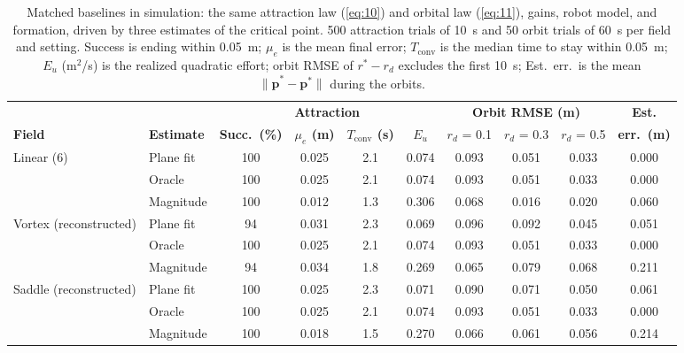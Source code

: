 \documentclass[10pt]{article}
\begin{document}
\begin{table}[h]
\centering
\footnotesize
\caption{Matched baselines in simulation: the same attraction law (\ref{eq:10}) and orbital law (\ref{eq:11}), gains, robot model, and formation, driven by three estimates of the critical point. 500 attraction trials of 10~s and 50 orbit trials of 60~s per field and setting. Success is ending within 0.05~m; $\mu_e$ is the mean final error; $T_{\mathrm{conv}}$ is the median time to stay within 0.05~m; $E_u$ (m$^2$/s) is the realized quadratic effort; orbit RMSE of $r^* - r_d$ excludes the first 10~s; Est.\ err.\ is the mean $\|\hat{\mathbf{p}}^* - \mathbf{p}^*\|$ during the orbits.}
\label{tab:baselines}
\setlength{\tabcolsep}{2.5pt}
\begin{tabular}{llcccc|ccc|c}
\hline
 & & \multicolumn{4}{c|}{\textbf{Attraction}} & \multicolumn{3}{c|}{\textbf{Orbit RMSE (m)}} & \textbf{Est.} \\
\textbf{Field} & \textbf{Estimate} & \textbf{Succ.\ (\%)} & \textbf{$\mu_e$ (m)} & \textbf{$T_{\mathrm{conv}}$ (s)} & \textbf{$E_u$} & $r_d$ = 0.1 & $r_d$ = 0.3 & $r_d$ = 0.5 & \textbf{err.\ (m)} \\
\hline
Linear (6) & Plane fit & 100 & 0.025 & 2.1 & 0.074 & 0.093 & 0.051 & 0.033 & 0.000 \\
 & Oracle & 100 & 0.025 & 2.1 & 0.074 & 0.093 & 0.051 & 0.033 & 0.000 \\
 & Magnitude & 100 & 0.012 & 1.3 & 0.306 & 0.068 & 0.016 & 0.020 & 0.060 \\
\hline
Vortex (reconstructed) & Plane fit & 94 & 0.031 & 2.3 & 0.069 & 0.096 & 0.092 & 0.045 & 0.051 \\
 & Oracle & 100 & 0.025 & 2.1 & 0.074 & 0.093 & 0.051 & 0.033 & 0.000 \\
 & Magnitude & 94 & 0.034 & 1.8 & 0.269 & 0.065 & 0.079 & 0.068 & 0.211 \\
\hline
Saddle (reconstructed) & Plane fit & 100 & 0.025 & 2.3 & 0.071 & 0.090 & 0.071 & 0.050 & 0.061 \\
 & Oracle & 100 & 0.025 & 2.1 & 0.074 & 0.093 & 0.051 & 0.033 & 0.000 \\
 & Magnitude & 100 & 0.018 & 1.5 & 0.270 & 0.066 & 0.061 & 0.056 & 0.214 \\
\hline
\end{tabular}
\end{table}
\end{document}
